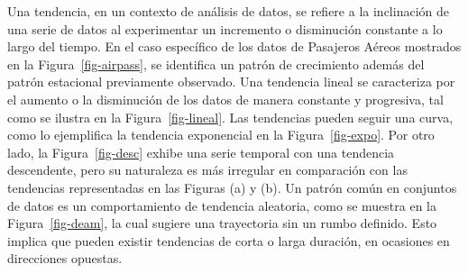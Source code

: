 \documentclass[
  us-letterpaper,
]{scrreprt}
\theoremstyle{plain}
\theoremstyle{definition}
\theoremstyle{definition}
\theoremstyle{plain}
\theoremstyle{remark}
\begin{document}
Una tendencia, en un contexto de análisis de datos, se refiere a la
inclinación de una serie de datos al experimentar un incremento o
disminución constante a lo largo del tiempo. En el caso específico de
los datos de Pasajeros Aéreos mostrados en la Figura~\ref{fig-airpass},
se identifica un patrón de crecimiento además del patrón estacional
previamente observado. Una tendencia lineal se caracteriza por el
aumento o la disminución de los datos de manera constante y progresiva,
tal como se ilustra en la Figura~\ref{fig-lineal}. Las tendencias pueden
seguir una curva, como lo ejemplifica la tendencia exponencial en la
Figura~\ref{fig-expo}. Por otro lado, la Figura~\ref{fig-desc} exhibe
una serie temporal con una tendencia descendente, pero su naturaleza es
más irregular en comparación con las tendencias representadas en las
Figuras (a) y (b). Un patrón común en conjuntos de datos es un
comportamiento de tendencia aleatoria, como se muestra en la
Figura~\ref{fig-deam}, la cual sugiere una trayectoria sin un rumbo
definido. Esto implica que pueden existir tendencias de corta o larga
duración, en ocasiones en direcciones opuestas.
\end{document}
